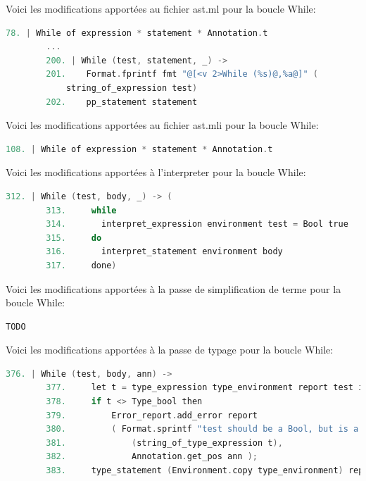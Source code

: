 \documentclass{report}
\begin{document}
    Voici les modifications apportées au fichier ast.ml pour la boucle While: \\

    \begin{lstlisting}[language=C, basicstyle=\ttfamily]
        78. | While of expression * statement * Annotation.t
        ...
        200. | While (test, statement, _) ->
        201.    Format.fprintf fmt "@[<v 2>While (%s)@,%a@]" (
            string_of_expression test)
        202.    pp_statement statement
    \end{lstlisting}

    Voici les modifications apportées au fichier ast.mli pour la boucle While: \\

    \begin{lstlisting}[language=C, basicstyle=\ttfamily]
        108. | While of expression * statement * Annotation.t
    \end{lstlisting}
    
    Voici les modifications apportées à l'interpreter pour la boucle While: \\

    \begin{lstlisting}[language=C, basicstyle=\ttfamily]
        312. | While (test, body, _) -> (
        313.     while
        314.       interpret_expression environment test = Bool true
        315.     do
        316.       interpret_statement environment body
        317.     done)
    \end{lstlisting}

    Voici les modifications apportées à la passe de simplification de terme pour la boucle While: \\

    \begin{lstlisting}[language=C, basicstyle=\ttfamily]
        TODO
    \end{lstlisting}

    Voici les modifications apportées à la passe de typage pour la boucle While: \\

    \begin{lstlisting}[language=C, basicstyle=\ttfamily]
        376. | While (test, body, ann) ->
        377.     let t = type_expression type_environment report test in
        378.     if t <> Type_bool then
        379.         Error_report.add_error report
        380.         ( Format.sprintf "test should be a Bool, but is a %s"
        381.             (string_of_type_expression t),
        382.             Annotation.get_pos ann );
        383.     type_statement (Environment.copy type_environment) report body
    \end{lstlisting}
\end{document}

